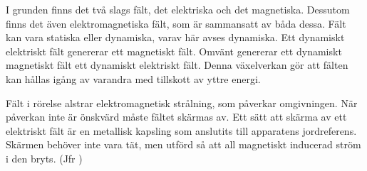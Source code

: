 I grunden finns det två slags fält, det elektriska och det magnetiska.
Dessutom finns det även elektromagnetiska fält, som är sammansatt av båda dessa.
Fält kan vara statiska eller dynamiska, varav här avses dynamiska.
Ett dynamiskt elektriskt fält genererar ett magnetiskt fält.
Omvänt genererar ett dynamiskt magnetiskt fält ett dynamiskt elektriskt fält.
Denna växelverkan gör att fälten kan hållas igång av varandra med tillskott av
yttre energi.

Fält i rörelse alstrar elektromagnetisk strålning, som påverkar omgivningen.
När påverkan inte är önskvärd måste fältet skärmas av.
Ett sätt att skärma av ett elektriskt fält är en metallisk kapsling som
anslutits till apparatens jordreferens.
Skärmen behöver inte vara tät, men utförd så att all magnetiskt inducerad ström
i den bryts. (Jfr )
